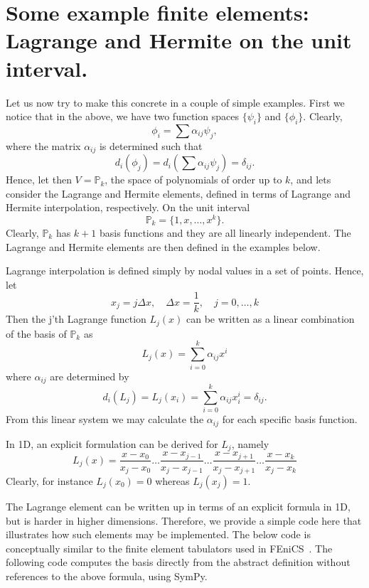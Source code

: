 \section{Some example finite elements: Lagrange and Hermite on the unit interval. }
Let us now try to make this concrete in a couple of simple examples. First we notice that  
in the above, we have two function spaces $\{\psi_i\}$ and $\{\phi_i\}$. Clearly, 
\[
\phi_i = \sum \alpha_{ij}\psi_j,  
\]
where the matrix $\alpha_{ij}$ is determined such that 
\[
d_i(\phi_j) = d_i(\sum \alpha_{ij} \psi_j) = \delta_{ij}. 
\]
Hence, let then $V=\mathbb{P}_k$, the space of polynomials of order up to $k$,  and lets consider the Lagrange and Hermite elements, defined in terms
of Lagrange and Hermite interpolation, respectively.  
On the unit interval
\[
\mathbb{P}_k = \{1, x, \ldots, x^k\}. 
\]
Clearly, $\mathbb{P}_k$ has $k+1$ basis functions  and they are all linearly independent. 
The Lagrange and Hermite elements are then defined in the examples below. 
\begin{exmp}
\label{lagrange:element}
Lagrange interpolation is defined simply by nodal values in a set of points. Hence, 
let 
\[
x_j = j \Delta x, \quad \Delta x = \frac{1}{k}, \quad  j= 0, \dots, k 
\]
	Then the j'th Lagrange function $L_j(x)$ can be written as a linear combination of the basis of $\mathbb{P}_k$ as 
\[ 
L_j(x) = \sum_{i=0}^k \alpha_{ij} x^i 
\]
where $\alpha_{ij}$ are determined by 
\[ 
d_i(L_j) = L_j(x_i) = \sum_{i=0}^k \alpha_{ij} x^i_i = \delta_{ij} . 
\]
From this linear system we may calculate the $\alpha_{ij}$ for each specific basis function. 

In 1D, an explicit formulation can be derived for $L_j$, namely 
\[
L_j(x) = \frac{x-x_0}{x_j-x_0} \ldots \frac{x-x_{j-1}}{x_j-x_{j-1}} \ldots \frac{x-x_{j+1}}{x_j-x_{j+1}} \ldots \frac{x-x_k}{x_j-x_k}  
\]
Clearly, for instance $L_j(x_0) = 0$ whereas  $L_j(x_j) = 1$.  
\end{exmp}
The Lagrange element  can be written up in terms of an explicit formula in 1D, but is harder in higher dimensions.
Therefore, we provide a simple code here that illustrates how such elements may be implemented. 
The below code is conceptually similar to the finite element tabulators used in FEniCS~\cite{kirby2012constructing,kirby2012fiat,alnaes2012syfi}.   
The following code computes the basis directly from the abstract definition without references to the above formula, using SymPy.  
